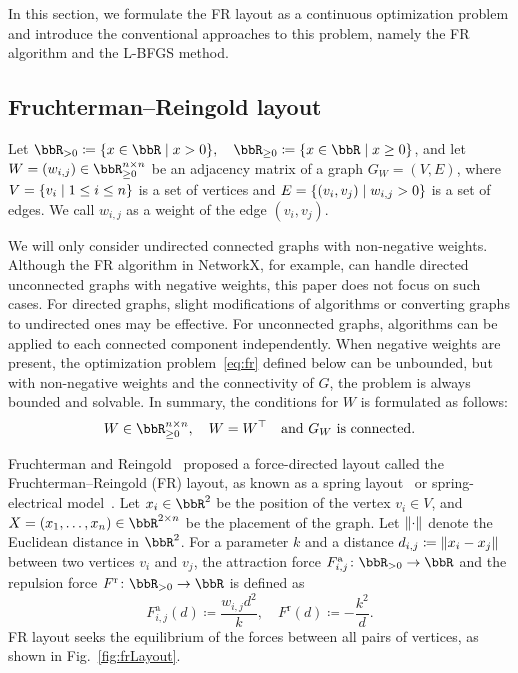 \documentclass[dvipdfmx,journal]{IEEEtran}
\newcommand{\defeq}{\coloneqq}
\begin{document}
In this section, we formulate the FR layout as a continuous optimization problem and introduce the conventional approaches to this problem, namely the FR algorithm and the L-BFGS method.

\subsection{Fruchterman--Reingold layout}\label{ssec:frLayout}

Let $\bbR_{> 0} \defeq \qty{ x \in \bbR \mid x > 0 }, \quad \bbR_{\geq 0} \defeq \qty{ x \in \bbR \mid x \geq 0 }$, and let $W = (w_{i,j}) \in \bbR_{\geq 0}^{n \times n}$ be an adjacency matrix of a graph $G_W = (V, E)$, where $V = \qty{v_i \mid 1 \leq i \leq n}$ is a set of vertices and $E = \qty{(v_i, v_j) \mid w_{i,j} > 0}$ is a set of edges. We call $w_{i,j}$ as a weight of the edge $(v_i, v_j)$.

We will only consider undirected connected graphs with non-negative weights.
Although the FR algorithm in NetworkX, for example, can handle directed unconnected graphs with negative weights, this paper does not focus on such cases.
For directed graphs, slight modifications of algorithms or converting graphs to undirected ones may be effective.
For unconnected graphs, algorithms can be applied to each connected component independently.
When negative weights are present, the optimization problem~\eqref{eq:fr} defined below can be unbounded, but with non-negative weights and the connectivity of $G$, the problem is always bounded and solvable.
In summary, the conditions for $W$ is formulated as follows:
\begin{equation}\label{eq:WCondition}
    W \in \bbR_{\geq 0}^{n \times n}, \quad W = W^\top \quad \text{and $G_W$ is connected}.
\end{equation}

Fruchterman and Reingold~\cite{fruchtermanGraphDrawingForcedirected1991} proposed a force-directed layout called the Fruchterman--Reingold (FR) layout, as known as a spring layout~\cite{hagberg2008exploring} or spring-electrical model~\cite{Hu2006EfficientHF}.
Let $x_i \in \bbR^2$ be the position of the vertex $v_i \in V$, and $X = (x_1, \dots, x_n) \in \bbR^{2 \times n}$ be the placement of the graph.
Let $\norm{\cdot}$ denote the Euclidean distance in $\bbR^2$. For a parameter $k$ and a distance $d_{i,j} \defeq \norm{x_i - x_j}$ between two vertices $v_i$ and $v_j$, the attraction force $F_{i,j}^\mathrm{a}\colon \bbR_{> 0} \to \bbR$ and the repulsion force $F^\mathrm{r}\colon \bbR_{> 0} \to \bbR$ is defined as
\begin{equation*}
    F_{i,j}^\mathrm{a}(d) \defeq \frac{w_{i,j} d^2}{k}, \quad F^\mathrm{r}(d) \defeq -\frac{k^2}{d}.
\end{equation*}
FR layout seeks the equilibrium of the forces between all pairs of vertices, as shown in Fig.~\ref{fig:frLayout}.
\end{document}
